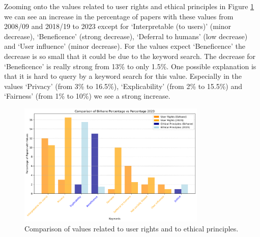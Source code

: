 \documentclass{article}
\begin{document}
Zooming onto the values related to user rights and ethical principles in Figure \ref{fig:subset_comparison_years}
we can see an increase in the percentage of papers with these values from 2008/09 and 2018/19 to 2023 except for `Interpretable (to users)' (minor decrease), `Beneficence' (strong decrease), `Deferral to humans' (low decrease) and `User influence' (minor decrease). For the values expect `Beneficence' the decrease is so small that it could be due to the keyword search. The decrease for `Beneficence' is really strong from 13\% to only 1.5\%. One possible explanation is that it is hard to query by a keyword search for this value. Especially in the values `Privacy' (from 3\% to 16.5\%), `Explicability' (from 2\% to 15.5\%) and `Fairness' (from 1\% to 10\%) we see a strong increase. 
\begin{figure}[H]
    \centering
    \includegraphics[width=0.8\textwidth,height=0.32\textheight]{../plots/subset_percentage_comparison.png}
    \caption{Comparison of values related to user rights and to ethical principles.}
    \label{fig:subset_comparison_years}
\end{figure}
\end{document}
